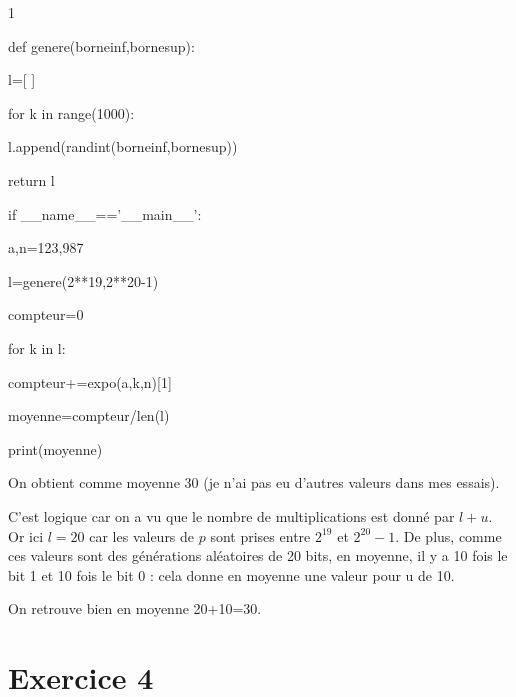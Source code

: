 1\documentclass[a4paper, 11pt,french]{article}
\begin{document}
\begin{center}
\begin{minipage}{0.5\linewidth}
\newcommand\esp{\hspace{1cm}}
def genere(borneinf,bornesup):

\esp    l=[ ]

\esp    for k in range(1000):

\esp\esp        l.append(randint(borneinf,bornesup))

\esp    return l




if \_\_name\_\_=='\_\_main\_\_':

\esp    a,n=123,987

\esp    l=genere(2**19,2**20-1)

\esp    compteur=0

\esp    for k in l:

\esp\esp        compteur+=expo(a,k,n)[1]

\esp    moyenne=compteur/len(l)

\esp    print(moyenne)

\end{minipage}
\end{center}

On obtient comme moyenne 30 (je n'ai pas eu d'autres valeurs dans mes essais).

C'est logique car on a vu que le nombre de multiplications est donné par $l+u$. Or ici $l=20$ car les valeurs de $p$ sont prises entre $2^{19}$ et $2^{20}-1$.
De plus, comme ces valeurs sont des générations aléatoires de 20 bits, en moyenne, il y a 10 fois le bit 1 et 10 fois le bit 0 : cela donne en moyenne une valeur pour u de 10.

On retrouve bien en moyenne 20+10=30.


\section*{Exercice 4}
\end{document}
